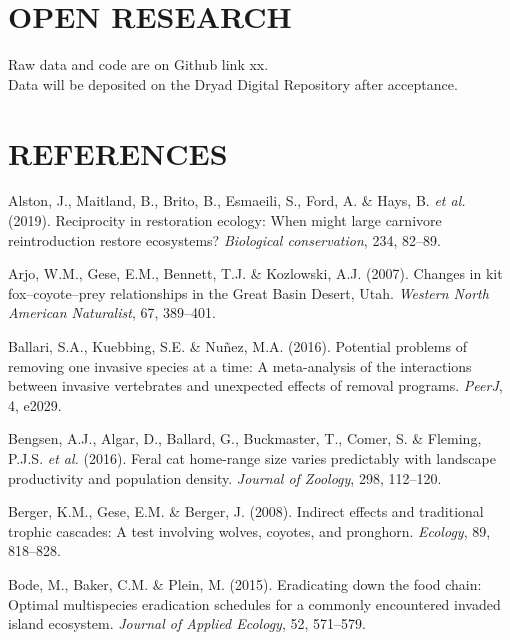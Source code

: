 \documentclass[]{elsarticle} %
\begin{document}
\hypertarget{open-research}{%
\section{OPEN RESEARCH}\label{open-research}}

Raw data and code are on Github link xx.\\
Data will be deposited on the Dryad Digital Repository after acceptance.

\newpage

\hypertarget{references}{%
\section*{REFERENCES}\label{references}}

\hypertarget{refs}{}
\leavevmode\hypertarget{ref-alston2019}{}%
Alston, J., Maitland, B., Brito, B., Esmaeili, S., Ford, A. \& Hays, B. \emph{et al.} (2019). Reciprocity in restoration ecology: When might large carnivore reintroduction restore ecosystems? \emph{Biological conservation}, 234, 82--89.

\leavevmode\hypertarget{ref-arjo2007}{}%
Arjo, W.M., Gese, E.M., Bennett, T.J. \& Kozlowski, A.J. (2007). Changes in kit fox--coyote--prey relationships in the Great Basin Desert, Utah. \emph{Western North American Naturalist}, 67, 389--401.

\leavevmode\hypertarget{ref-ballari2016}{}%
Ballari, S.A., Kuebbing, S.E. \& Nuñez, M.A. (2016). Potential problems of removing one invasive species at a time: A meta-analysis of the interactions between invasive vertebrates and unexpected effects of removal programs. \emph{PeerJ}, 4, e2029.

\leavevmode\hypertarget{ref-https:ux2fux2fdoi.orgux2f10.1111ux2fjzo.12290}{}%
Bengsen, A.J., Algar, D., Ballard, G., Buckmaster, T., Comer, S. \& Fleming, P.J.S. \emph{et al.} (2016). Feral cat home-range size varies predictably with landscape productivity and population density. \emph{Journal of Zoology}, 298, 112--120.

\leavevmode\hypertarget{ref-berger2008indirect}{}%
Berger, K.M., Gese, E.M. \& Berger, J. (2008). Indirect effects and traditional trophic cascades: A test involving wolves, coyotes, and pronghorn. \emph{Ecology}, 89, 818--828.

\leavevmode\hypertarget{ref-bode2015}{}%
Bode, M., Baker, C.M. \& Plein, M. (2015). Eradicating down the food chain: Optimal multispecies eradication schedules for a commonly encountered invaded island ecosystem. \emph{Journal of Applied Ecology}, 52, 571--579.
\end{document}
